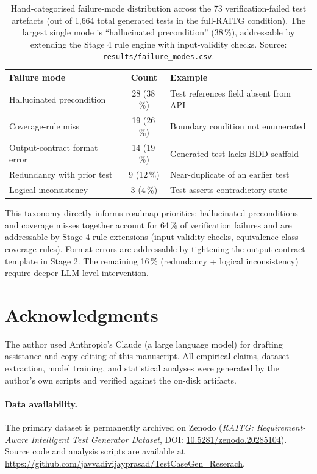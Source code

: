 \documentclass[sigconf,nonacm,review]{acmart}
\begin{document}
\begin{table}[!ht]
\centering
\caption{Hand-categorised failure-mode distribution across the 73
verification-failed test artefacts (out of 1{,}664 total generated
tests in the full-RAITG condition). The largest single mode is
``hallucinated precondition'' (38\,\%), addressable by extending
the Stage 4 rule engine with input-validity checks. Source:
\texttt{results/failure\_modes.csv}.}
\label{tab:failure_modes}
\small
\begin{tabular}{lcl}
\toprule
Failure mode                       & Count & Example \\
\midrule
Hallucinated precondition          & 28 (38\,\%) & Test references field absent from API \\
Coverage-rule miss                 & 19 (26\,\%) & Boundary condition not enumerated \\
Output-contract format error       & 14 (19\,\%) & Generated test lacks BDD scaffold \\
Redundancy with prior test         & 9 (12\,\%)  & Near-duplicate of an earlier test  \\
Logical inconsistency              & 3 (4\,\%)   & Test asserts contradictory state \\
\bottomrule
\end{tabular}
\end{table}

This taxonomy directly informs roadmap priorities: hallucinated
preconditions and coverage misses together account for 64\,\% of
verification failures and are addressable by Stage 4 rule extensions
(input-validity checks, equivalence-class coverage rules). Format
errors are addressable by tightening the output-contract template in
Stage 2. The remaining 16\,\% (redundancy + logical inconsistency)
require deeper LLM-level intervention.

\section*{Acknowledgments}
The author used Anthropic's Claude (a large language model) for drafting assistance and copy-editing of this manuscript. All empirical claims, dataset extraction, model training, and statistical analyses were generated by the author's own scripts and verified against the on-disk artifacts.

\paragraph*{Data availability.} The primary dataset is permanently archived on Zenodo (\textit{RAITG: Requirement-Aware Intelligent Test Generator Dataset}, DOI: \href{https://doi.org/10.5281/zenodo.20285104}{10.5281/zenodo.20285104}). Source code and analysis scripts are available at \url{https://github.com/javvadivijayprasad/TestCaseGen_Reserach}.



\end{document}
